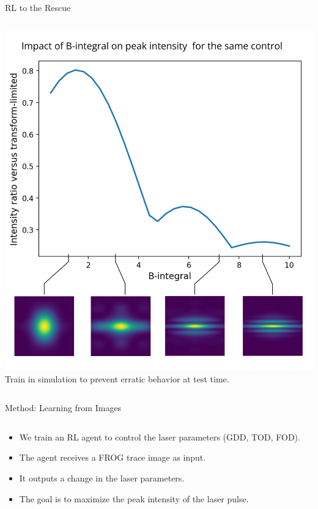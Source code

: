 \documentclass{beamer}
\begin{document}
\begin{frame}{RL to the Rescue}
\begin{columns}[T,totalwidth=\textwidth]
\begin{column}[t]{0.33\textwidth}
        \includegraphics[width=\linewidth]{images/peak_intensity.png}
        \vspace{0.5em}
        Train in simulation to prevent erratic behavior at test time.
    \end{column}
\end{columns}
\end{frame}
\begin{frame}{Method: Learning from Images}
\begin{columns}[T,totalwidth=\textwidth]
    \begin{column}{0.5\textwidth}
        \begin{itemize}
            \item We train an RL agent to control the laser parameters (GDD, TOD, FOD).
            \item The agent receives a FROG trace image as input.
            \item It outputs a change in the laser parameters.
            \item The goal is to maximize the peak intensity of the laser pulse.
        \end{itemize}
    \end{column}
    \begin{column}{0.5\textwidth}
    \end{column}
\end{columns}
\end{frame}
\end{document}
